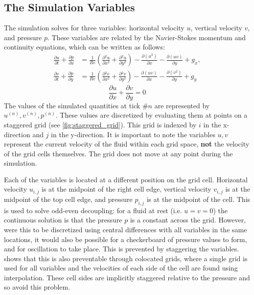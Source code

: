 \subsection{The Simulation Variables}
The simulation solves for three variables: horizontal velocity $u$, vertical velocity $v$, and pressure $p$.
These variables are related by the Navier-Stokes momentum and continuity equations, which can be written as follows:
\newcommand{\partialderiv}[2]{\frac{\partial{#1}}{\partial{#2}}}
\newcommand{\paren}[1]{\left(#1\right)}
\begin{equation}
\begin{aligned}
    \partialderiv{u}{t} + \partialderiv{p}{x} &= \frac{1}{Re}\paren{ \partialderiv{^2u}{x^2} + \partialderiv{^2u}{y^2}} - \partialderiv{(u^2)}{x} - \partialderiv{(uv)}{y} + g_x, \\
    \partialderiv{v}{t} + \partialderiv{p}{y} &= \frac{1}{Re}\paren{ \partialderiv{^2v}{x^2} + \partialderiv{^2v}{y^2}} - \partialderiv{(uv)}{x} - \partialderiv{(v^2)}{y} + g_y
    \label{eq:NavierStokesMomentum}
\end{aligned}
\end{equation}
\begin{equation}
\label{eq:NavierStokesContinuity}
    \frac{\partial{u}}{\partial{x}} + \frac{\partial{v}}{\partial{y}} = 0
\end{equation}
The values of the simulated quantities at tick $\#n$ are represented by $u^{(n)}, v^{(n)}, p^{(n)}$.
These values are discretized by evaluating them at points on a staggered grid (see \cref{fig:staggered_grid}).
This grid is indexed by $i$ in the x-direction and $j$ in the y-direction.
It is important to note the variables $u,v$ represent the current velocity of the fluid within each grid space, \textbf{not} the velocity of the grid cells themselves.
The grid does not move at any point during the simulation.



Each of the variables is located at a different position on the grid cell.
Horizontal velocity $u_{i,j}$ is at the midpoint of the right cell edge, vertical velocity $v_{i,j}$ is at the midpoint of the top cell edge, and pressure $p_{i,j}$ is at the midpoint of the cell.
This is used to solve odd-even decoupling\cite{Harlow1965NumericalSurface}: for a fluid at rest (i.e. $u = v = 0$) the continuous solution is that the pressure $p$ is a constant across the grid.
However, were this to be discretized using central differences with all variables in the same locations, it would also be possible for a checkerboard of pressure values to form, and for oscillation to take place\cite{book:griebel1998numerical}.
This is prevented by staggering the variables.
\cite{peric1988comparison} shows that this is also preventable through colocated grids, where a single grid is used for all variables and the velocities of each side of the cell are found using interpolation.
These cell sides are implicitly staggered relative to the pressure and so avoid this problem.

